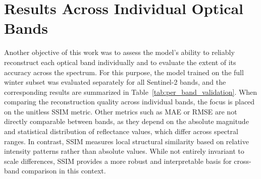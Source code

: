\section{Results Across Individual Optical Bands}
Another objective of this work was to assess the model’s ability to reliably reconstruct each optical band individually and to evaluate the extent of its accuracy across the spectrum. 
For this purpose, the model trained on the full winter subset was evaluated separately for all Sentinel-2 bands, and the corresponding results are summarized in Table~\ref{tab:per_band_validation}.
When comparing the reconstruction quality across individual bands, the focus is placed on the unitless SSIM metric. Other metrics such as MAE or RMSE are not directly comparable between bands, as they depend on the absolute magnitude and statistical distribution of reflectance values, which differ across spectral ranges. In contrast, SSIM measures local structural similarity based on relative intensity patterns rather than absolute values. While not entirely invariant to scale differences, SSIM provides a more robust and interpretable basis for cross-band comparison in this context.

